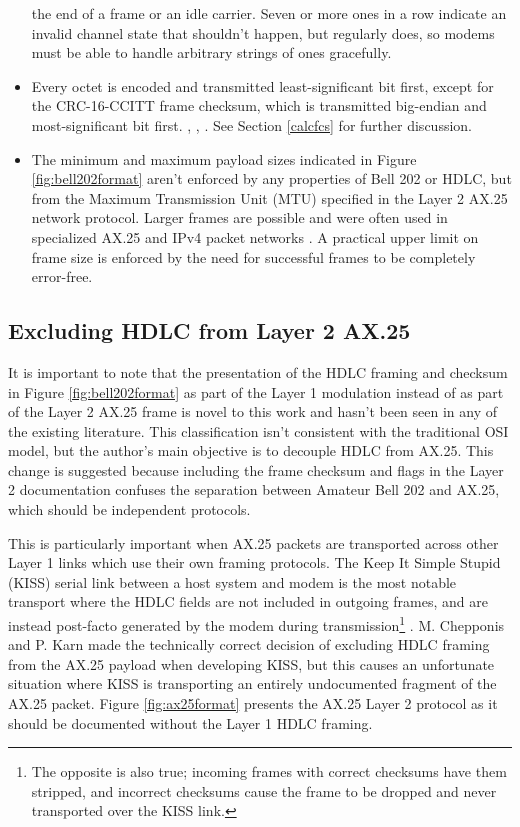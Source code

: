 \begin{itemize}
{			the end of a frame or an idle carrier.
			Seven or more ones in a row indicate an invalid channel state
			that shouldn't happen, but regularly does, so modems must be 
			able to handle arbitrary strings of ones gracefully.}
	\item Every octet is encoded and transmitted least-significant bit first,
		except for the CRC-16-CCITT frame checksum, 
		which is transmitted big-endian
		and most-significant bit first.
		\cite[\S3.8]{ax25spec},
		\cite[\S8.1.1-2]{ituv42},
		\cite{n1vgphy}.
		See Section \ref{calcfcs} for further discussion.
	\item The minimum and maximum payload sizes indicated in Figure 
		\ref{fig:bell202format} aren't enforced by any properties of 
		Bell 202 or HDLC, but from the Maximum Transmission Unit (MTU)
		specified in the Layer 2 AX.25 network protocol.
		Larger frames are possible and were often used in specialized 
		AX.25 and IPv4 packet networks \cite{pattersoninterview}.
		A practical upper limit on frame size is enforced by
		the need for successful frames to be completely error-free.


\end{itemize}

\subsection{Excluding HDLC from Layer 2 AX.25}

It is important to note that the presentation of the HDLC framing
and checksum
in Figure \ref{fig:bell202format} as part of the Layer 1 modulation 
instead of as part of the Layer 2 AX.25 frame is 
novel to this work and hasn't been seen in any of the existing literature.
This classification isn't consistent with the traditional OSI model,
but the author's main objective is to decouple HDLC from AX.25.
This change is suggested because including the frame checksum and flags
in the Layer 2 documentation confuses the separation between Amateur Bell 202 
and AX.25, which should be independent protocols.

This is particularly important when AX.25 packets are transported across 
other Layer 1 links which use their own framing protocols.
The Keep It Simple Stupid (KISS) serial link between 
a host system and modem is the most notable
transport where the HDLC fields are not included in outgoing frames, 
and are instead 
post-facto generated by the modem during transmission\footnote{The opposite
	is also true; incoming frames with correct checksums have them stripped,
	and incorrect checksums cause the frame to be dropped and never
transported over the KISS link.} \cite{KISSspec}.
M. Chepponis and P. Karn made the technically correct decision of excluding 
HDLC framing from the AX.25 payload when developing KISS, but this causes
an unfortunate situation where KISS is transporting an entirely
undocumented fragment of the AX.25 packet. Figure \ref{fig:ax25format} 
presents the AX.25 Layer 2 protocol as it should be documented without
the Layer 1 HDLC framing.

